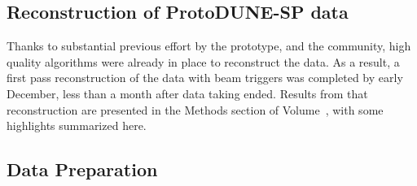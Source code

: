 \subsection{Reconstruction of ProtoDUNE-SP data}
Thanks to substantial previous effort by the  prototype,  and the   community, high quality algorithms were already in place to reconstruct the   data.  As a result, a first pass reconstruction of the  data with beam triggers was completed by early December, less than a month after data taking ended.  Results from that reconstruction are presented in the Methods section of Volume~\volnumberphysics, \voltitlephysics{} with some highlights summarized here. 



\subsection{Data Preparation}

